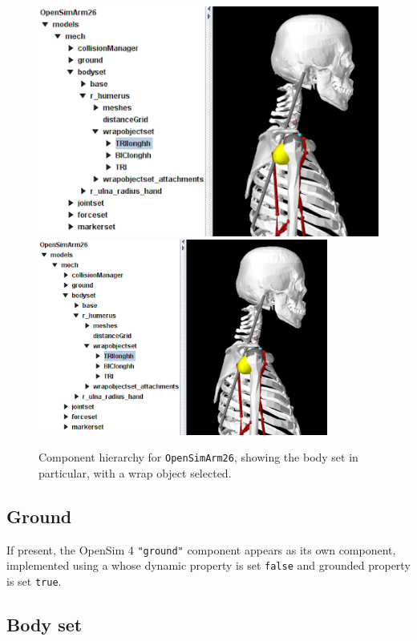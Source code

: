\begin{figure}[ht]
\begin{center}
   \iflatexml 
      \includegraphics[]{images/Arm26Hierarchy1} 
   \else 
      \includegraphics[width=3.75in]{images/Arm26Hierarchy1} \fi
\end{center}
\caption{Component hierarchy for {\tt OpenSimArm26}, showing
the body set in particular, with a wrap object selected.}
\label{Arm26Hierarchy1:fig}
\end{figure}

\subsection{Ground}

If present, the OpenSim 4 {\tt "ground"} component appears as its own
component, implemented using a  whose {\sf dynamic}
property is set {\tt false} and {\sf grounded} property is set {\tt true}.

\subsection{Body set}

